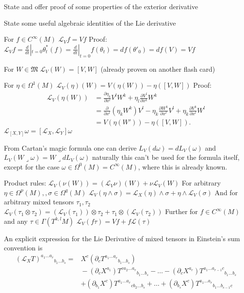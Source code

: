 State and offer proof of some properties of the exterior derivative



State some useful algebraic identities of the Lie derivative 

For \( f \in C^\infty(M) \)
\( \mathcal{L}_{V}f = Vf \)
Proof:
\( \mathcal{L}_{V}f = \frac{d}{dt}|_{t=0} \theta^\ast_t(f) = \frac{d}{dt}|_{t=0} f(\theta_t) = df(\theta'_0) = df(V) = Vf \)

For \( W \in \mathfrak{M} \)
\( \mathcal{L}_V(W) = [V, W] \)
(already proven on another flash card)

For \( \eta \in \Omega^1(M) \)
\( \mathcal{L}_{V}(\eta)(W) = V(\eta(W)) - \eta([V, W]) \)
Proof:
\[
\begin{aligned}
\mathcal{L}_{V}(\eta(W)) &= \frac{\partial \eta_k}{\partial x^l} V^l W^k + \eta_l \frac{\partial V^l}{\partial x^k} W^k \\
&= \frac{\partial}{\partial x^l} (\eta_k W^k) V^l - \eta_k \frac{\partial W^k}{\partial x^l} V^l + \eta_k \frac{\partial V^k}{\partial x^l} W^l \\
&= V (\eta(W')) - \eta([V, W]).
\end{aligned}
\]
\( \mathcal{L}_{[X, Y]}\omega = [\mathcal{L}_{X}, \mathcal{L}_{Y}]\omega \)

From Cartan's magic formula one can derive 
\( L_{V}(d\omega) = dL_{V}(\omega) \) and \( L_{V}(W \lrcorner \omega) = W \lrcorner dL_{V}(\omega) \)
naturally this can't be used for the formula itself, except for the case \( \omega \in \Omega^{0}(M) = C^\infty(M) \), where this is already known.

Product rules:
\( \mathcal{L}_{V}(\nu(W)) = (\mathcal{L}_V \nu)(W) + \nu \mathcal{L}_V(W) \)
For arbitrary \(\eta \in \Omega^p(M), , \sigma \in \Omega^q(M) \)
\( \mathcal{L}_V(\eta \wedge \sigma) = \mathcal{L}_X(\eta) \wedge \sigma + \eta \wedge \mathcal{L}_V(\sigma) \)
And for arbitrary mixed tensors \( \tau_1, \tau_2 \)
\( \mathcal{L}_{V}(\tau_1 \otimes \tau_2) = (\mathcal{L}_{V}(\tau_1)) \otimes \tau_2 + \tau_1 \otimes (\mathcal{L}_{V}(\tau_2)) \)
Further for \( f \in C^\infty(M) \) and any \( \tau \in \Gamma(T^{k,l}M) \)
\( \mathcal{L}_V(f\tau) = Vf + f\mathcal{L}(\tau) \)

An explicit expression for the Lie Derivative of mixed tensors in Einstein's sum convention is
\[
\begin{align}
(\mathcal{L}_X T) ^{a_1 \ldots a_r}{}_{b_1 \ldots b_s} ={}
& X^c(\partial_c T^{a_1 \ldots a_r}{}_{b_1 \ldots b_s}) \\
& {}-{} (\partial_c X ^{a_1}) T ^{c a_2 \ldots a_r}{}_{b_1 \ldots b_s} - \ldots - (\partial_c X^{a_r}) T ^{a_1 \ldots a_{r-1}c}{}_{b_1 \ldots b_s} \\
& + (\partial_{b_1} X^c) T ^{a_1 \ldots a_r}{}_{c b_2 \ldots b_s} + \ldots + (\partial_{b_s}X^c) T ^{a_1 \ldots a_r}{}_{b_1 \ldots b_{s-1} c}
\end{align}
\]


